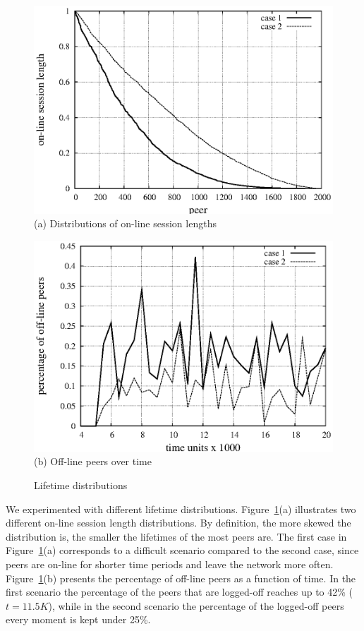 \documentclass{llncs}
\begin{document}
\begin{figure}[t]
\begin{minipage}[t]{0.5\linewidth}
    \includegraphics[width=0.99\columnwidth]{distribution.eps}\\
    \centering \small{(a) Distributions of on-line session lengths}
\end{minipage}
\begin{minipage}[t]{0.5\linewidth}
    \includegraphics[width=0.99\columnwidth]{alive.eps}\\
     \centering \small{(b) Off-line peers over time}
\end{minipage}
\caption{Lifetime distributions} \label{fig:lifetime-distr}
\end{figure}

We experimented with different lifetime distributions. Figure~\ref{fig:lifetime-distr}(a) illustrates two different on-line session length distributions. By definition, the more skewed the distribution is, the smaller the lifetimes of the most peers are. The first case in Figure~\ref{fig:lifetime-distr}(a) corresponds to a difficult scenario compared to the second case, since peers are on-line for shorter time periods and leave the network more often. Figure~\ref{fig:lifetime-distr}(b) presents the percentage of off-line peers as a function of time. In the first scenario the percentage of the peers that are logged-off reaches up to 42\% ($t=11.5K$), while in the second scenario the percentage of the logged-off peers every moment is kept under 25\%.
\end{document}
